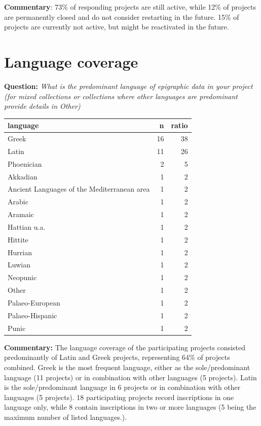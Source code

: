 \documentclass[
  12pt,
]{scrreprt}
\begin{document}
\normalsize

\textbf{Commentary}: 73\% of responding projects are still active, while
12\% of projects are permanently closed and do not consider restarting
in the future. 15\% of projects are currently not active, but might be
reactivated in the future.

\hypertarget{language-coverage-1}{%
\section{Language coverage}\label{language-coverage-1}}

\textbf{Question:} \emph{What is the predominant language of epigraphic
data in your project (for mixed collections or collections where other
languages are predominant provide details in Other)}

\footnotesize

\begin{longtable}[]{@{}lrr@{}}
\toprule
language & n & ratio \\
\midrule
\endhead
Greek & 16 & 38 \\
Latin & 11 & 26 \\
Phoenician & 2 & 5 \\
Akkadian & 1 & 2 \\
Ancient Languages of the Mediterranean area & 1 & 2 \\
Arabic & 1 & 2 \\
Aramaic & 1 & 2 \\
Hattian u.a. & 1 & 2 \\
Hittite & 1 & 2 \\
Hurrian & 1 & 2 \\
Luwian & 1 & 2 \\
Neopunic & 1 & 2 \\
Other & 1 & 2 \\
Palaeo-European & 1 & 2 \\
Palaeo-Hispanic & 1 & 2 \\
Punic & 1 & 2 \\
\bottomrule
\end{longtable}

\normalsize

\footnotesize

\normalsize

\textbf{Commentary:} The language coverage of the participating projects
consisted predominantly of Latin and Greek projects, representing 64\%
of projects combined. Greek is the most frequent language, either as the
sole/predominant language (11 projects) or in combination with other
languages (5 projects). Latin is the sole/predominant language in 6
projects or in combination with other languages (5 projects). 18
participating projects record inscriptions in one language only, while 8
contain inscriptions in two or more languages (5 being the maximum
number of listed languages.).
\end{document}

